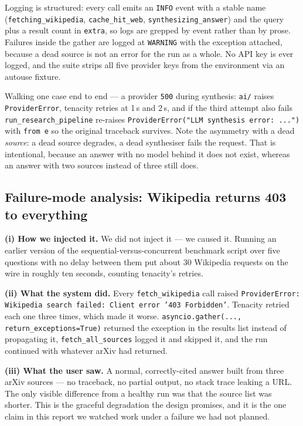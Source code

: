 \documentclass[11pt,a4paper]{article}
\begin{document}
Logging is structured: every call emits an \texttt{INFO} event with a stable name
(\texttt{fetching\_wikipedia}, \texttt{cache\_hit\_web}, \texttt{synthesizing\_answer}) and the
query plus a result count in \texttt{extra}, so logs are grepped by event rather than by prose.
Failures inside the gather are logged at \texttt{WARNING} with the exception attached, because a
dead source is not an error for the run as a whole. No API key is ever logged, and the suite
strips all five provider keys from the environment via an autouse fixture.

Walking one case end to end --- a provider \texttt{500} during synthesis: \texttt{ai/} raises
\texttt{ProviderError}, tenacity retries at 1\,s and 2\,s, and if the third attempt also fails
\texttt{run\_research\_pipeline} re-raises \texttt{ProviderError("LLM synthesis error: ...")}
with \texttt{from e} so the original traceback survives. Note the asymmetry with a dead
\emph{source}: a dead source degrades, a dead synthesiser fails the request. That is intentional,
because an answer with no model behind it does not exist, whereas an answer with two sources
instead of three still does.

\subsection{Failure-mode analysis: Wikipedia returns 403 to everything}\label{sec:failure}

\textbf{(i) How we injected it.} We did not inject it --- we caused it. Running an earlier version of the
sequential-versus-concurrent benchmark script over five questions with no delay between them put about
30 Wikipedia requests on the wire in roughly ten seconds, counting tenacity's retries.

\textbf{(ii) What the system did.} Every \texttt{fetch\_wikipedia} call raised
\texttt{ProviderError: Wikipedia search failed: Client error '403 Forbidden'}. Tenacity retried
each one three times, which made it worse. \texttt{asyncio.gather(...,
return\_exceptions=True)} returned the exception in the results list instead of propagating it,
\texttt{fetch\_all\_sources} logged it and skipped it, and the run continued with whatever arXiv
had returned.

\textbf{(iii) What the user saw.} A normal, correctly-cited answer built from three arXiv
sources --- no traceback, no partial output, no stack trace leaking a URL. The only visible
difference from a healthy run was that the source list was shorter. This is the graceful
degradation the design promises, and it is the one claim in this report we watched work under a
failure we had not planned.
\end{document}
